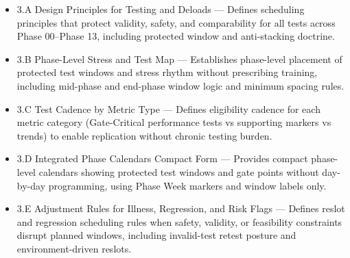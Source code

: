 \documentclass[10pt]{article}
\begin{document}
\begin{itemize}
\item 3.A Design Principles for Testing and Deloads — Defines scheduling principles that protect validity, safety, and comparability for all tests across Phase 00–Phase 13, including protected window and anti-stacking doctrine.
\item 3.B Phase-Level Stress and Test Map — Establishes phase-level placement of protected test windows and stress rhythm without prescribing training, including mid-phase and end-phase window logic and minimum spacing rules.
\item 3.C Test Cadence by Metric Type — Defines eligibility cadence for each metric category (Gate-Critical performance tests vs supporting markers vs trends) to enable replication without chronic testing burden.
\item 3.D Integrated Phase Calendars Compact Form — Provides compact phase-level calendars showing protected test windows and gate points without day-by-day programming, using Phase Week markers and window labels only.
\item 3.E Adjustment Rules for Illness, Regression, and Risk Flags — Defines reslot and regression scheduling rules when safety, validity, or feasibility constraints disrupt planned windows, including invalid-test retest posture and environment-driven reslots.
\end{itemize}
\end{document}

